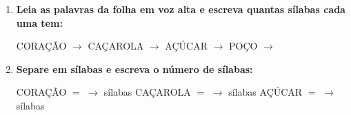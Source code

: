 \begin{exercicio}
\begin{enumerate}[resume]
  \item \textbf{Leia as palavras da folha em voz alta e escreva quantas sílabas cada uma tem:}

  \begin{center}
  CORAÇÃO $\rightarrow$ \underline{\hspace{1cm}} \quad CAÇAROLA $\rightarrow$ \underline{\hspace{1cm}} \quad AÇÚCAR $\rightarrow$ \underline{\hspace{1cm}} \quad POÇO $\rightarrow$ \underline{\hspace{1cm}}
  \end{center}

  \item \textbf{Separe em sílabas e escreva o número de sílabas:}
  \begin{center}
  CORAÇÃO $=$ \underline{\hspace{1.2cm}} $\rightarrow$ \underline{\hspace{0.8cm}} sílabas \quad CAÇAROLA $=$ \underline{\hspace{1.2cm}} $\rightarrow$ \underline{\hspace{0.8cm}} sílabas \quad AÇÚCAR $=$ \underline{\hspace{1.2cm}} $\rightarrow$ \underline{\hspace{0.8cm}} sílabas
  \end{center}

\end{enumerate}

\end{exercicio}



